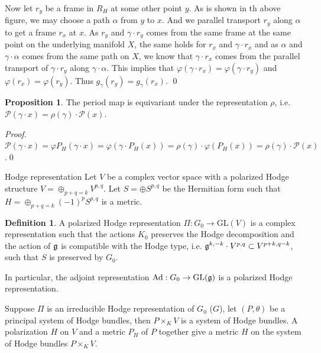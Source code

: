 \documentclass[aspectratio=169, 10pt]{beamer}
\theoremstyle{definition}
\newtheorem{Def}{Definition}
\theoremstyle{example}
\newtheorem{proposition}[theorem]{Proposition}
\begin{document}
\begin{frame}[allowframebreaks]
			Now let $r_y$ be a frame in $R_H$ at some other point $y$. As is shown in th above figure, we may choose a path $\alpha$ from $y$ to $x$. And we parallel transport $r_y$ along $\alpha$ to get a frame $r_x$ at $x$. As $r_y$ and $\gamma\cdot r_y$ comes from the same frame at the same point on the underlying manifold $X$, the same holds for $r_x$ and $\gamma\cdot r_x$ and as $\alpha$ and $\gamma\cdot \alpha$ comes from the same path on $X$, we know that $\gamma\cdot r_x$ comes from the parallel transport of $\gamma\cdot r_y$ along $\gamma\cdot\alpha$. This implies that $\varphi(\gamma\cdot r_x)=\varphi(\gamma\cdot r_y)$ and $\varphi(r_x)=\varphi(r_y)$. Thus $g_\gamma(r_y)=g_\gamma(r_x)$.  \hfill \qed
			\begin{proposition}\label{equiv}
			The period map is equivariant under the representation $\rho$, i.e. $\mathcal{P}(\gamma \cdot x)=\rho(\gamma)\cdot \mathcal{P}(x)$.
		\end{proposition}
		\noindent \textit{Proof.} 
			$\mathcal{P}(\gamma \cdot x)=\varphi P_H(\gamma\cdot x)=\varphi(\gamma\cdot P_H(x))=\rho(\gamma)\cdot \varphi(P_H(x))=\rho(\gamma)\cdot \mathcal{P}(x)$.\hfill \qed
	\end{frame}
	\begin{frame}{Hodge representation}
		Let $V$ be a complex vector space with a polarized Hodge structure $V=\oplus_{p+q=k} V^{p,q}$. Let $S=\oplus S^{p,q}$ be the Hermitian form such that $H=\oplus_{p+q=k} (-1)^p S^{p,q}$ is a metric. 
		\begin{Def}
			A polarized Hodge representation $\Pi: G_0 \to \mathrm{GL}(V)$ is a complex representation such that the actions $K_0$ preserves the Hodge decomposition and the action of $\mathfrak{g}$ is compatible with the Hodge type, i.e. $\mathfrak{g}^{k,-k}\cdot V^{p,q}\subset V^{p+k,q-k}$, such that $S$ is preserved by $G_0$.
		\end{Def}
		In particular, the adjoint representation $\operatorname{Ad}: G_0\to \operatorname{GL}(\mathfrak{g})$ is a polarized Hodge representation.

		Suppose $\Pi$ is an irreducible Hodge representation of $G_0$ ($G$), let $(P,\theta)$ be a principal system of Hodge bundles, then $P\times_K V$ is a system of Hodge bundles. A polarization $H$ on $V$ and a metric $P_H$ of $P$ together give a metric $H$ on the system of Hodge bundles $P\times_K V$.	
	\end{frame}
	
\end{document}
